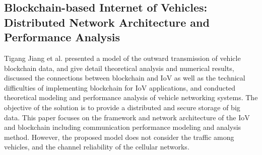 			\subsection{Blockchain-based Internet of Vehicles: Distributed Network Architecture and Performance Analysis \cite{paper6}}
			Tigang Jiang et al. presented a model of the outward transmission of vehicle blockchain data, and give detail theoretical analysis and numerical results, discussed the connections between blockchain and IoV as well as the technical difficulties of implementing blockchain for IoV applications, and conducted theoretical modeling and performance analysis of vehicle networking systems. The objective of the solution is to provide a distributed and secure storage of big data. This paper focuses on the framework and network architecture of the IoV and blockchain including communication performance modeling and analysis method. However, the proposed model does not consider the traffic among vehicles, and the channel reliability of the cellular networks.

